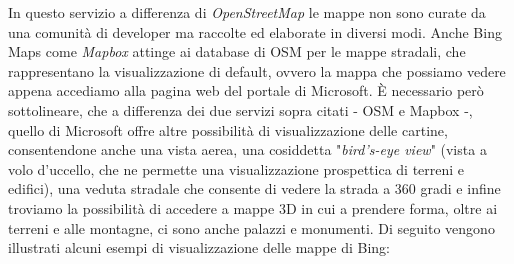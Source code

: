 In questo servizio a differenza di \textit{OpenStreetMap} le mappe non sono curate da una comunità di developer ma raccolte ed elaborate in diversi modi. Anche Bing Maps come \textit{Mapbox} attinge ai database di OSM per le mappe stradali, che rappresentano la visualizzazione di default, ovvero la mappa che possiamo vedere appena accediamo alla pagina web del portale di Microsoft. È necessario però sottolineare, che a differenza dei due servizi sopra citati - OSM e Mapbox -, quello di Microsoft offre altre possibilità di visualizzazione delle cartine, consentendone anche una vista aerea, una cosiddetta "\textit{bird's-eye view}" (vista a volo d'uccello, che ne permette una visualizzazione prospettica di terreni e edifici), una veduta stradale che consente di vedere la strada a 360 gradi e infine troviamo la possibilità di accedere a mappe 3D in cui a prendere forma, oltre ai terreni e alle montagne, ci sono anche palazzi e monumenti. Di seguito vengono illustrati alcuni esempi di visualizzazione delle mappe di Bing:
